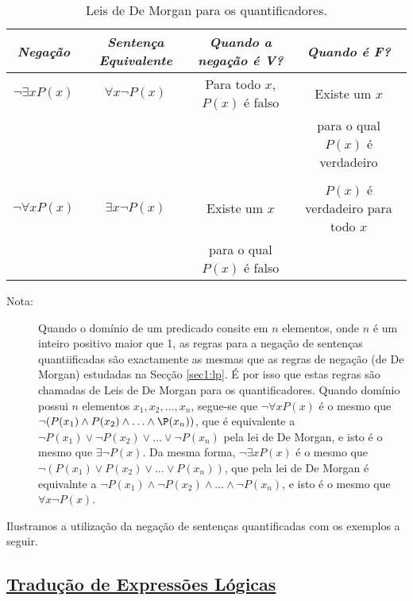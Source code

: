 \begin{table}[H]
	\centering
	\scriptsize{
	\begin{tabular}{|c||c||c||c|}%
	\toprule
	\textbf{\emph{Negação}}&\textbf{\emph{Sentença
	Equivalente}}&\textbf{\emph{Quando a negação é V?}}&\textbf{\emph{Quando
	é F?}}\\
	\midrule
	$\lnot \exists xP(x)$ & $\forall x\lnot P(x)$ & Para todo $x$, $P(x)$ é falso &
	Existe um $x$ \\ & & & para o qual $P(x)$ é verdadeiro\\
	&&& \\
	
	$\lnot \forall xP(x)$ & $\exists x\lnot P(x)$ & Existe um $x$ & $P(x)$ é verdadeiro para todo $x$\\
	& & para o qual $P(x)$ é falso &\\
	\bottomrule%
	\end{tabular}%
	}
	\caption{Leis de De Morgan para os quantificadores.}
	\label{tab128}
\end{table}

\begin{description}
\item[Nota:] Quando o domínio de um predicado consite em $n$ elementos, onde $n$
é um inteiro positivo maior que 1, as regras para a negação de sentenças
quantiificadas são exactamente as mesmas que as regras de negação (de De Morgan)
estudadas na Secção \ref{sec1:lp}. É por isso que estas regras são chamadas de
Leis de De Morgan para os quantificadores. Quando domínio possui $n$ elementos
$x_1, x_2, \ldots, x_n$, segue-se que $\lnot\forall xP(x)$ é o mesmo que
$\lnot(P(x_1) \land P(x_2) \land \ldots \land \P(x_n))$, que é equivalente a
$\lnot P(x_1) \lor \lnot P(x_2) \lor \ldots \lor \lnot P(x_n)$ pela lei de De
Morgan, e isto é o mesmo que $\exists\lnot P(x)$. Da mesma forma, $\lnot\exists
xP(x)$ é o mesmo que $\lnot(P(x_1) \lor P(x_2) \lor \ldots \lor P(x_n))$, que
pela lei de De Morgan é equivalnte a $\lnot P(x_1) \land \lnot P(x_2) \land
\ldots \land \lnot P(x_n) $, e isto é o mesmo que $\forall x\lnot P(x)$.
\end{description}

Ilustramos a utilização da negação de sentenças quantificadas com os exemplos a
seguir.

 \subsection*{\underline{Tradução de Expressões Lógicas}}

